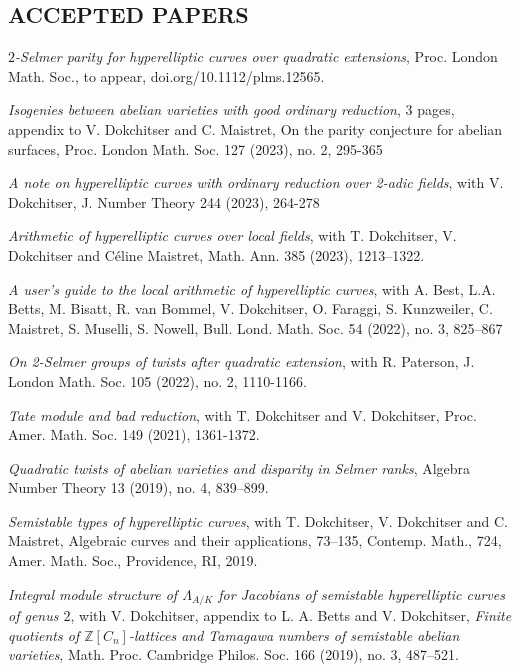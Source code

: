 \documentclass{res}
\begin{document}
\begin{resume}
\section{ACCEPTED PAPERS}         
        
\bigskip

\vspace{-0.1in}	

{\it $2$-Selmer parity for hyperelliptic curves over quadratic extensions},  Proc. London Math. Soc., to appear, doi.org/10.1112/plms.12565.\

{\it Isogenies between abelian varieties with good ordinary reduction}, 3 pages, appendix to  V. Dokchitser and C. Maistret, {On the parity conjecture for abelian surfaces}, Proc. London Math. Soc. 127 (2023), no. 2, 295-365 \

\vspace{-0.1in}	
{\it A note on hyperelliptic curves with ordinary reduction over 2-adic fields}, with V. Dokchitser, J. Number Theory 244 (2023), 264-278\

\vspace{-0.1in}	
{\it Arithmetic of hyperelliptic curves over local fields}, with T. Dokchitser, V. Dokchitser and C\'{e}line Maistret, Math. Ann. 385 (2023), 1213–1322.  \

{\it A user's guide to the local arithmetic of hyperelliptic curves}, with A. Best, L.A. Betts, M. Bisatt, R. van Bommel, V. Dokchitser, O. Faraggi, S. Kunzweiler, C. Maistret, S. Muselli, S. Nowell,  Bull. Lond. Math. Soc. 54 (2022), no. 3, 825--867

{\it On 2-Selmer groups of twists after quadratic extension}, with R. Paterson, J. London Math. Soc. 105 (2022), no. 2, 1110-1166. \

{\it Tate module and bad reduction}, with T. Dokchitser and V. Dokchitser, Proc. Amer. Math. Soc. 149 (2021), 1361-1372.

{\it Quadratic twists of abelian varieties and disparity in Selmer ranks},  Algebra Number Theory 13 (2019), no. 4, 839–899. \

{\it Semistable types of hyperelliptic curves}, with T. Dokchitser, V. Dokchitser and C. Maistret, Algebraic curves and their applications, 73–135, Contemp. Math., 724, Amer. Math. Soc., Providence, RI, 2019. \

   {\it Integral module structure of $\Lambda_{A/K}$ for Jacobians of
semistable hyperelliptic curves of genus $2$}, with V. Dokchitser, appendix to L. A. Betts and V. Dokchitser, {\it Finite quotients of  $\mathbb{Z}[C_n]$-lattices and Tamagawa numbers of semistable abelian varieties}, Math. Proc. Cambridge Philos. Soc. 166 (2019), no. 3, 487–521. 
%

\end{resume}
\end{document}
